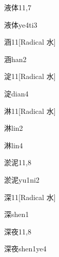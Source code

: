 \begin{entry}{液体}{11,7}
  \begin{phonetics}{液体}{ye4ti3}
  \end{phonetics}
\end{entry}

\begin{entry}{涵}{11}[Radical 水]
  \begin{phonetics}{涵}{han2}
  \end{phonetics}
\end{entry}

\begin{entry}{淀}{11}[Radical 水]
  \begin{phonetics}{淀}{dian4}
  \end{phonetics}
\end{entry}

\begin{entry}{淋}{11}[Radical 水]
  \begin{phonetics}{淋}{lin2}
  \end{phonetics}
  \begin{phonetics}{淋}{lin4}
  \end{phonetics}
\end{entry}

\begin{entry}{淤泥}{11,8}
  \begin{phonetics}{淤泥}{yu1ni2}
  \end{phonetics}
\end{entry}

\begin{entry}{深}{11}[Radical 水]
  \begin{phonetics}{深}{shen1}
  \end{phonetics}
\end{entry}

\begin{entry}{深夜}{11,8}
  \begin{phonetics}{深夜}{shen1ye4}
  \end{phonetics}
\end{entry}

